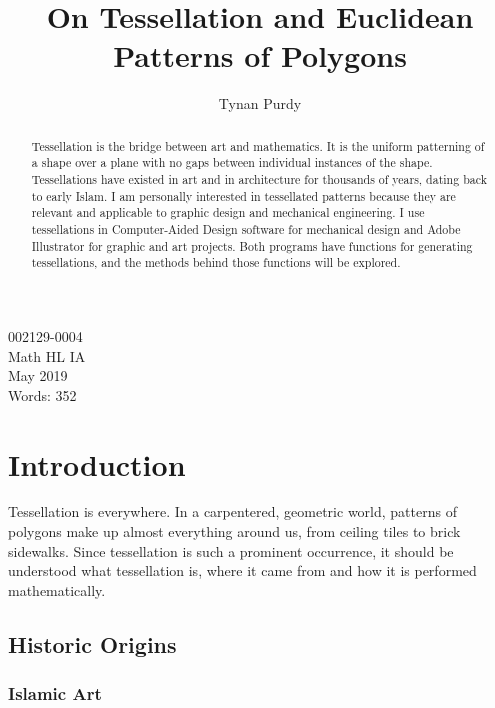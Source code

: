 \documentclass[12pt,letterpaper]{article}
\title{On Tessellation and Euclidean Patterns of Polygons}
\author{Tynan Purdy}
\date{\vspace{-5ex}}
\begin{document}
\large
\parindent=0.5in
{\fontsize{12}{14.4}
	{\singlespace
	\maketitle
	\begin{center}
	\vspace{4mm}
	002129-0004 \\
	\vspace{4mm}
	Math HL IA \\
	\vspace{4mm}
	May 2019 \\
	\vspace{4mm}
	Words: 352\\
	\end{center}
	}
}	

\newpage
{}
\begin{abstract}
Tessellation is the bridge between art and mathematics. It is the uniform patterning of a shape over a plane with no gaps between individual instances of the shape. Tessellations have existed in art and in architecture for thousands of years, dating back to early Islam. \citep{arabic} I am personally interested in tessellated patterns because they are relevant and applicable to graphic design and mechanical engineering. I use tessellations in Computer-Aided Design software for mechanical design and Adobe Illustrator for graphic and art projects. Both programs have functions for generating tessellations, and the methods behind those functions will be explored.
\end{abstract}

\newpage
\tableofcontents

\newpage
\section{Introduction}
Tessellation is everywhere. In a carpentered, geometric world, patterns of polygons make up almost everything around us, from ceiling tiles to brick sidewalks. Since tessellation is such a prominent occurrence, it should be understood what tessellation is, where it came from and how it is performed mathematically. 
\subsection{Historic Origins}
\subsubsection{Islamic Art}
\end{document}
